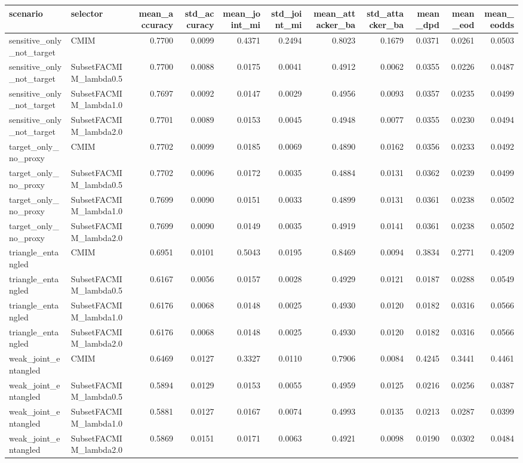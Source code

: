 \begin{tabular}{llrrrrrrrrr}
\toprule
scenario & selector & mean_accuracy & std_accuracy & mean_joint_mi & std_joint_mi & mean_attacker_ba & std_attacker_ba & mean_dpd & mean_eod & mean_eodds \\
\midrule
sensitive_only_not_target & CMIM & 0.7700 & 0.0099 & 0.4371 & 0.2494 & 0.8023 & 0.1679 & 0.0371 & 0.0261 & 0.0503 \\
sensitive_only_not_target & SubsetFACMIM_lambda0.5 & 0.7700 & 0.0088 & 0.0175 & 0.0041 & 0.4912 & 0.0062 & 0.0355 & 0.0226 & 0.0487 \\
sensitive_only_not_target & SubsetFACMIM_lambda1.0 & 0.7697 & 0.0092 & 0.0147 & 0.0029 & 0.4956 & 0.0093 & 0.0357 & 0.0235 & 0.0499 \\
sensitive_only_not_target & SubsetFACMIM_lambda2.0 & 0.7701 & 0.0089 & 0.0153 & 0.0045 & 0.4948 & 0.0077 & 0.0355 & 0.0230 & 0.0494 \\
target_only_no_proxy & CMIM & 0.7702 & 0.0099 & 0.0185 & 0.0069 & 0.4890 & 0.0162 & 0.0356 & 0.0233 & 0.0492 \\
target_only_no_proxy & SubsetFACMIM_lambda0.5 & 0.7702 & 0.0096 & 0.0172 & 0.0035 & 0.4884 & 0.0131 & 0.0362 & 0.0239 & 0.0499 \\
target_only_no_proxy & SubsetFACMIM_lambda1.0 & 0.7699 & 0.0090 & 0.0151 & 0.0033 & 0.4899 & 0.0131 & 0.0361 & 0.0238 & 0.0502 \\
target_only_no_proxy & SubsetFACMIM_lambda2.0 & 0.7699 & 0.0090 & 0.0149 & 0.0035 & 0.4919 & 0.0141 & 0.0361 & 0.0238 & 0.0502 \\
triangle_entangled & CMIM & 0.6951 & 0.0101 & 0.5043 & 0.0195 & 0.8469 & 0.0094 & 0.3834 & 0.2771 & 0.4209 \\
triangle_entangled & SubsetFACMIM_lambda0.5 & 0.6167 & 0.0056 & 0.0157 & 0.0028 & 0.4929 & 0.0121 & 0.0187 & 0.0288 & 0.0549 \\
triangle_entangled & SubsetFACMIM_lambda1.0 & 0.6176 & 0.0068 & 0.0148 & 0.0025 & 0.4930 & 0.0120 & 0.0182 & 0.0316 & 0.0566 \\
triangle_entangled & SubsetFACMIM_lambda2.0 & 0.6176 & 0.0068 & 0.0148 & 0.0025 & 0.4930 & 0.0120 & 0.0182 & 0.0316 & 0.0566 \\
weak_joint_entangled & CMIM & 0.6469 & 0.0127 & 0.3327 & 0.0110 & 0.7906 & 0.0084 & 0.4245 & 0.3441 & 0.4461 \\
weak_joint_entangled & SubsetFACMIM_lambda0.5 & 0.5894 & 0.0129 & 0.0153 & 0.0055 & 0.4959 & 0.0125 & 0.0216 & 0.0256 & 0.0387 \\
weak_joint_entangled & SubsetFACMIM_lambda1.0 & 0.5881 & 0.0127 & 0.0167 & 0.0074 & 0.4993 & 0.0135 & 0.0213 & 0.0287 & 0.0399 \\
weak_joint_entangled & SubsetFACMIM_lambda2.0 & 0.5869 & 0.0151 & 0.0171 & 0.0063 & 0.4921 & 0.0098 & 0.0190 & 0.0302 & 0.0484 \\
\bottomrule
\end{tabular}
